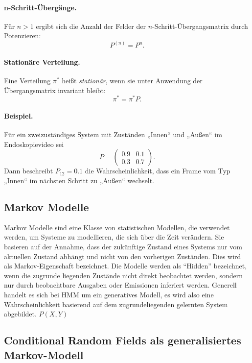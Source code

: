 \paragraph{n-Schritt-Übergänge.}
Für $n > 1$ ergibt sich die Anzahl der Felder der $n$-Schritt-Übergangsmatrix durch Potenzieren:
\begin{equation}
P^{(n)} = P^n.
\end{equation}

\paragraph{Stationäre Verteilung.}
Eine Verteilung $\pi^*$ heißt \emph{stationär}, wenn sie unter Anwendung der Übergangsmatrix invariant bleibt:
\begin{equation}
\pi^* = \pi^* P.
\end{equation}

\paragraph{Beispiel.}
Für ein zweizuständiges System mit Zuständen „Innen“ und „Außen“ im Endoskopievideo sei
\[
P = \begin{pmatrix}
0.9 & 0.1 \\
0.3 & 0.7
\end{pmatrix}.
\]
Dann beschreibt $P_{12} = 0.1$ die Wahrscheinlichkeit, dass ein Frame vom Typ „Innen“ im nächsten Schritt zu „Außen“ wechselt.


\subsection{Markov Modelle}

Markov Modelle sind eine Klasse von statistischen Modellen, die verwendet werden, um Systeme zu modellieren, die sich über die Zeit verändern. Sie basieren auf der Annahme, dass der zukünftige Zustand eines Systems nur vom aktuellen Zustand abhängt und nicht von den vorherigen Zuständen. Dies wird als Markov-Eigenschaft bezeichnet.
Die Modelle werden als \enquote{Hidden} bezeichnet, wenn die zugrunde liegenden Zustände nicht direkt beobachtet werden, sondern nur durch beobachtbare Ausgaben oder Emissionen inferiert werden.
\newline
Generell handelt es sich bei HMM um ein generatives Modell, es wird also eine Wahrscheinlichkeit basierend auf dem zugrundeliegenden gelernten System abgebildet.
$P(X, Y)$


\subsection{Conditional Random Fields als generalisiertes Markov-Modell}

